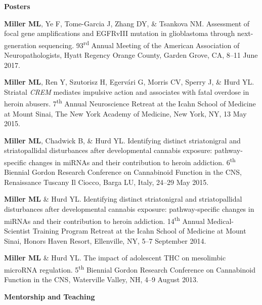 \documentclass[10pt]{article}
\begin{document}
\begin{description}
\item \textbf{Posters}

\item[\quad] \textbf{Miller ML}, Ye F, Tome-Garcia J, Zhang DY, \& Tsankova NM. Assessment of focal gene amplifications and EGFRvIII mutation in glioblastoma through next-generation sequencing. 93\textsuperscript{rd} Annual Meeting of the American Association of Neuropathologists, Hyatt Regency Orange County, Garden Grove, CA, 8--11 June 2017.

\item[\quad] \textbf{Miller ML}, Ren Y, Szutorisz H, Egervári G, Morris CV, Sperry J, \& Hurd YL. Striatal \textit{CREM} mediates impulsive action and associates with fatal overdose in heroin abusers. 7\textsuperscript{th} Annual Neuroscience Retreat at the Icahn School of Medicine at Mount Sinai, The New York Academy of Medicine, New York, NY, 13 May 2015.

\item[\quad] \textbf{Miller ML}, Chadwick B, \& Hurd YL. Identifying distinct striatonigral and striatopallidal disturbances after developmental cannabis exposure: pathway-specific changes in miRNAs and their contribution to heroin addiction. 6\textsuperscript{th} Biennial Gordon Research Conference on Cannabinoid Function in the CNS, Renaissance Tuscany Il Ciocco, Barga LU, Italy, 24--29 May 2015.

\item[\quad] \textbf{Miller ML} \& Hurd YL. Identifying distinct striatonigral and striatopallidal disturbances after developmental cannabis exposure: pathway-specific changes in miRNAs and their contribution to heroin addiction. 14\textsuperscript{th} Annual Medical-Scientist Training Program Retreat at the Icahn School of Medicine at Mount Sinai, Honors Haven Resort, Ellenville, NY, 5--7 September 2014.

\item[\quad] \textbf{Miller ML} \& Hurd YL. The impact of adolescent THC on mesolimbic microRNA regulation. 5\textsuperscript{th} Biennial Gordon Research Conference on Cannabinoid Function in the CNS, Waterville Valley, NH, 4--9 August 2013.
\end{description}

\vspace{0.1in}
{\large \textbf{Mentorship and Teaching}}
\end{document}
